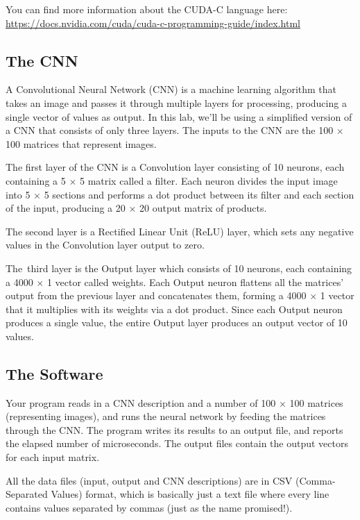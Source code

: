 You can find more information about the CUDA-C language here:\\ \url{https://docs.nvidia.com/cuda/cuda-c-programming-guide/index.html}


\subsection*{The CNN}

A Convolutional Neural Network (CNN) is a machine learning algorithm that takes an image and passes it through multiple layers for processing, producing a single vector of values as output. In this lab, we'll be using a simplified version of a CNN that consists of only three layers. The inputs to the CNN are the 100 $\times$ 100 matrices that represent images.

The first layer of the CNN is a Convolution layer consisting of 10 neurons, each containing a 5 $\times$ 5 matrix called a filter. Each neuron divides the input image into 5 $\times$ 5 sections and performs a dot product between its filter and each section of the input, producing a 20 $\times$ 20 output matrix of products.

The second layer is a Rectified Linear Unit (ReLU) layer, which sets any negative values in the Convolution layer output to zero.

The\ third layer is the Output layer which consists of 10 neurons, each containing a 4000 $\times$ 1 vector called weights. Each Output neuron flattens all the matrices' output from the previous layer and concatenates them, forming a 4000 $\times$ 1 vector that it multiplies with its weights via a dot product. Since each Output neuron produces a single value,  the entire Output layer produces an output vector of 10 values.

\subsection*{The Software}

Your program reads in a CNN description and a number of 100 $\times$ 100 matrices (representing images), and runs the neural network by feeding the matrices through the CNN. The program writes its results to an output file, and reports the elapsed number of microseconds. The output files contain the output vectors for each input matrix.

All the data files (input, output and CNN descriptions) are in CSV (Comma-Separated Values) format, which is basically just a text file where every line contains values separated by commas (just as the name promised!).

